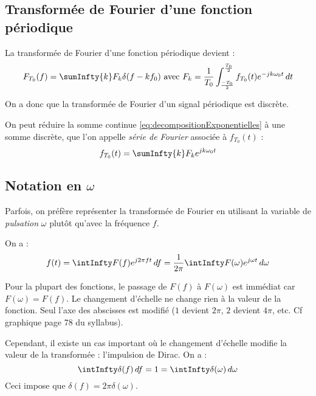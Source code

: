         \subsection{Transformée de Fourier d'une fonction périodique}
            La transformée de Fourier d'une fonction périodique devient :
            \begin{equation}
                F_{T_0}(f) = \sumInfty{k} F_k \delta(f - kf_0) \mbox{ avec } F_k = \frac{1}{T_0}\int_{\frac{-T_0}{2}}^{\frac{T_0}{2}} f_{T_0}(t) e^{-jk\omega_0 t}\,dt
                \label{eq:transformeeFourierPeriodique}
            \end{equation}

            On a donc que la transformée de Fourier d'un signal périodique est discrète.

            On peut réduire la somme continue \eqref{eq:decompositionExponentielles} à une somme discrète, que l'on appelle \textit{série de Fourier} associée à $f_{T_0}(t)$ :
            \begin{equation}
                f_{T_0}(t) = \sumInfty{k} F_k e^{jk\omega_0 t}
                \label{eq:serieFourier}
            \end{equation}

        \subsection{Notation en $\omega$}
            Parfois, on préfère représenter la transformée de Fourier en utilisant la variable de \textit{pulsation} $\omega$ plutôt qu'avec la fréquence $f$.

            On a :
            $$
                f(t) = \intInfty F(f)e^{j2\pi f t}\,df = \frac{1}{2\pi}\intInfty F(\omega) e^{j\omega t}\,d\omega
            $$

            Pour la plupart des fonctions, le passage de $F(f)$ à $F(\omega)$ est immédiat car $F(\omega) = F(f)$. Le changement d'échelle ne change rien à la valeur de la fonction. Seul l'axe des abscisses est modifié ($1$ devient $2\pi$, $2$ devient $4\pi$, etc. Cf graphique page 78 du syllabus).

            Cependant, il existe un cas important où le changement d'échelle modifie la valeur de la transformée : l'impulsion de Dirac. On a :
            $$
                \intInfty\delta(f)\,df = 1 = \intInfty\delta(\omega)\,d\omega
            $$
            Ceci impose que $\delta(f) = 2\pi\delta(\omega)$.

